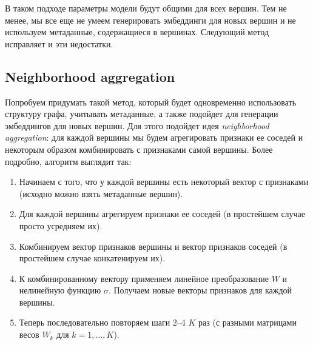 \documentclass[12pt,a4paper]{article}
\begin{document}
В таком подходе параметры модели будут общими для всех вершин. Тем не менее, мы все еще не умеем генерировать эмбеддинги для новых вершин и не используем метаданные, содержащиеся в вершинах. Следующий метод исправляет и эти недостатки. 

\subsection{Neighborhood aggregation}

Попробуем придумать такой метод, который будет одновременно использовать структуру графа, учитывать метаданные, а также подойдет для генерации эмбеддингов для новых вершин. Для этого подойдет идея \emph{neighborhood aggregation}: для каждой вершины мы будем агрегировать признаки ее соседей и некоторым образом комбинировать с признаками самой вершины. Более подробно, алгоритм выглядит так:
\begin{enumerate}
    \item Начинаем с того, что у каждой вершины есть некоторый вектор с признаками (исходно можно взять метаданные вершин).
    \item Для каждой вершины агрегируем признаки ее соседей (в простейшем случае просто усредняем их).
    \item Комбинируем вектор признаков вершины и вектор признаков соседей (в простейшем случае конкатенируем их).
    \item К комбинированному вектору применяем линейное преобразование $W$ и нелинейную функцию $\sigma$. Получаем новые векторы признаков для каждой вершины.
    \item Теперь последовательно повторяем шаги 2--4 $K$ раз (с разными матрицами весов $W_k$ для $k=1,\dots, K$).
\end{enumerate}
\end{document}
